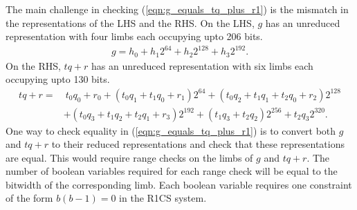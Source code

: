 \documentclass[a4paper, 12pt]{article}
\begin{document}
The main challenge in checking (\ref{eqn:g_equals_tq_plus_r1}) is the mismatch in the representations of the LHS and the RHS. On the LHS, $g$ has an unreduced representation with four limbs each occupying upto 206 bits.
\begin{align*}
   g = h_0 + h_1 2^{64} + h_2 2^{128} + h_3 2^{192}.
\end{align*}
On the RHS, $tq+r$ has an unreduced representation with six limbs each occupying upto 130 bits.
\begin{align*}
  tq+r  =&\ t_0q_0+r_0 + (t_0q_1 + t_1q_0 + r_1) 2^{64} + (t_0q_2 + t_1q_1 + t_2q_0 + r_2) 2^{128}\\
  & + (t_0q_3 + t_1q_2 + t_2q_1 + r_3) 2^{192}+ (t_1q_3 + t_2q_2) 2^{256} + t_2q_3 2^{320}.
\end{align*}
One way to check equality in (\ref{eqn:g_equals_tq_plus_r1}) is to convert both $g$ and $tq+r$ to their reduced representations and check that these representations are equal. This would require range checks on the limbs of $g$ and $tq+r$. The number of boolean variables required for each range check will be equal to the bitwidth of the corresponding limb. Each boolean variable requires one constraint of the form $b(b-1) = 0$ in the R1CS system.
\end{document}

